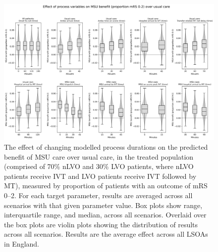\begin{figure}[h!]
    \centering
    \includegraphics[width=1\linewidth]{images/msu_net_mrs_0-2_benefit.png}
    \caption{The effect of changing modelled process durations on the predicted benefit of MSU care over usual care, in the treated population (comprised of 70\% nLVO and 30\% LVO patients, where nLVO patients receive IVT and LVO patients receive IVT followed by MT), measured by proportion of patients with an outcome of mRS 0--2. For each target parameter, results are averaged across all scenarios with that given parameter value. Box plots show range, interquartile range, and median, across all scenarios. Overlaid over the box plots are violin plots showing the distribution of results across all scenarios. Results are the average effect across all LSOAs in England.}
    \label{fig:scenarios_mrs}
\end{figure}

